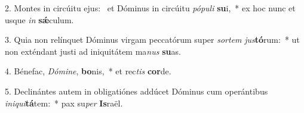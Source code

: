 2. Montes in circúitu ejus: \dag\  et Dóminus in circúitu \textit{pó}\textit{pu}\textit{li} \textbf{su}i,~*  ex hoc nunc et usque \textit{in} \textbf{sǽ}culum.\

3. Quia non relínquet Dóminus virgam peccatórum super \textit{sor}\textit{tem} \textit{jus}\textbf{tó}rum:~*  ut non exténdant justi ad iniquitátem ma\textit{nus} \textbf{su}as.\

4. Bénefac, \textit{Dó}\textit{mi}\textit{ne}, \textbf{bo}nis,~*  et rec\textit{tis} \textbf{cor}de.\

5. Declinántes autem in obligatiónes addúcet Dóminus cum operántibus \textit{in}\textit{i}\textit{qui}\textbf{tá}tem:~*  pax su\textit{per} \textbf{Is}raël.\

